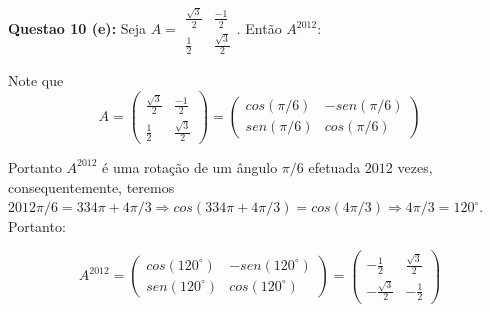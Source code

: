 \documentclass{article}
\begin{document}
\textbf{Questao 10 (e):} Seja 
$A = 
\begin{array}{cc}
      \frac{\sqrt{3}}{2} & \frac{-1}{2} \\
      \frac{1}{2} & \frac{\sqrt{3}}{2} 
\end{array}$. Então $A^{2012}$:

Note que 
$$A = 
\left(
\begin{array}{cc}
      \frac{\sqrt{3}}{2} & \frac{-1}{2} \\
      \frac{1}{2} & \frac{\sqrt{3}}{2} 
\end{array} 
\right) =
\left(
\begin{array}{cc}
      cos(\pi/6) & -sen(\pi/6) \\
      sen(\pi/6) & cos(\pi/6) 
\end{array} 
\right)
$$

Portanto $A^{2012}$ é uma rotação de um ângulo $\pi/6$ efetuada $2012$ vezes,
consequentemente, teremos $2012\pi/6 = 334\pi + 4\pi/3 \Rightarrow cos(334\pi +
4\pi/3) = cos(4\pi/3) \Rightarrow 4\pi/3 = 120^{\circ}$. Portanto:

$$A^{2012} = 
\left(
\begin{array}{cc}
      cos(120^{\circ}) & -sen(120^{\circ}) \\
      sen(120^{\circ}) & cos(120^{\circ}) 
\end{array} 
\right) =
\left(
\begin{array}{cc}
      -\frac{1}{2} & \frac{\sqrt{3}}{2} \\
      -\frac{\sqrt{3}}{2} & -\frac{1}{2} 
\end{array} 
\right) 
$$
\end{document}
